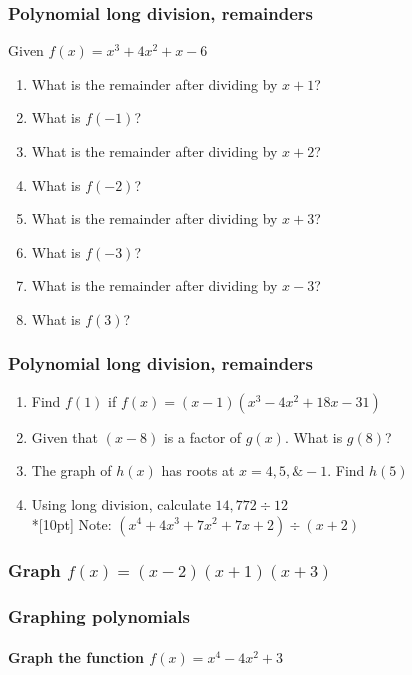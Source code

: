\documentclass{beamer}
\begin{document}
\frame
{
  \frametitle{Polynomial long division, remainders }
  
    \begin{block}{Given $f(x)=x^3+4x^2+x-6$} 
        \begin{enumerate}
            \item What is the remainder after dividing by $x+1$?
            \item What is $f(-1)$?
            \item What is the remainder after dividing by $x+2$?
            \item What is $f(-2)$?
            \item What is the remainder after dividing by $x+3$?
            \item What is $f(-3)$?
            \item What is the remainder after dividing by $x-3$?
            \item What is $f(3)$?
        \end{enumerate}
    \end{block}
}

\frame
{
  \frametitle{Polynomial long division, remainders }
\begin{enumerate}
    \item Find $f(1)$ if $f(x)=(x-1)(x^3-4x^2+18x-31)$
    \item Given that $(x-8)$ is a factor of $g(x)$. What is $g(8)$?
    \item The graph of $h(x)$ has roots at $x=4, 5, \& -1$. Find $h(5)$
    \item Using long division, calculate $14,772 \div 12$\\*[10pt] 
    Note: $(x^4+4x^3+7x^2+7x+2) \div (x+2)$
\end{enumerate}

}

\frame
{
  \frametitle{Graph $f(x)=(x-2)(x+1)(x+3)$}
  
}

\frame
{
  \frametitle{Graphing polynomials}
  \framesubtitle{Graph the function $f(x)=x^4-4x^2+3$}
  
}
\end{document}
